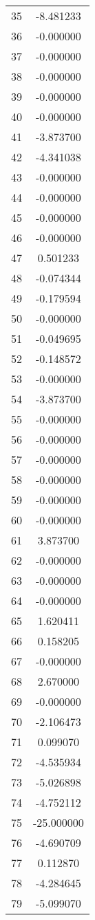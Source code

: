\documentclass[12pt]{article}
\begin{document}
\begin{longtable}{@{}cc@{}}
35 & -8.481233 \\
36 & -0.000000 \\
37 & -0.000000 \\
38 & -0.000000 \\
39 & -0.000000 \\
40 & -0.000000 \\
41 & -3.873700 \\
42 & -4.341038 \\
43 & -0.000000 \\
44 & -0.000000 \\
45 & -0.000000 \\
46 & -0.000000 \\
47 & 0.501233 \\
48 & -0.074344 \\
49 & -0.179594 \\
50 & -0.000000 \\
51 & -0.049695 \\
52 & -0.148572 \\
53 & -0.000000 \\
54 & -3.873700 \\
55 & -0.000000 \\
56 & -0.000000 \\
57 & -0.000000 \\
58 & -0.000000 \\
59 & -0.000000 \\
60 & -0.000000 \\
61 & 3.873700 \\
62 & -0.000000 \\
63 & -0.000000 \\
64 & -0.000000 \\
65 & 1.620411 \\
66 & 0.158205 \\
67 & -0.000000 \\
68 & 2.670000 \\
69 & -0.000000 \\
70 & -2.106473 \\
71 & 0.099070 \\
72 & -4.535934 \\
73 & -5.026898 \\
74 & -4.752112 \\
75 & -25.000000 \\
76 & -4.690709 \\
77 & 0.112870 \\
78 & -4.284645 \\
79 & -5.099070 \\

\end{longtable}
\end{document}
